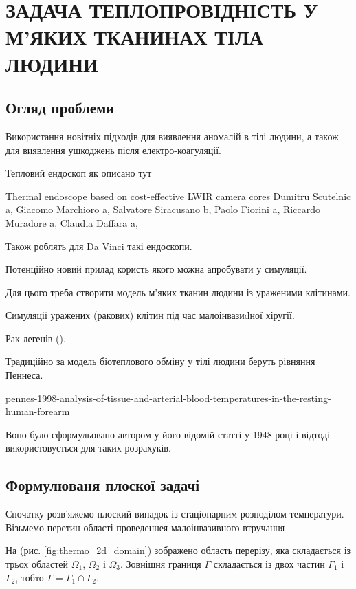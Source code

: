 \chapter{ЗАДАЧА ТЕПЛОПРОВІДНІСТЬ У М'ЯКИХ ТКАНИНАХ ТІЛА ЛЮДИНИ}

\nocite{bahvalov-et-al,tumor-thermal-modell,lung-tumor-thermal-conductivity,database-tissue-properties} 

\section{Огляд проблеми}

Використання новітніх підходів для виявлення аномалій в тілі людини, а також для виявлення ушкоджень після 
електро-коагуляції.

Тепловий ендоскоп як описано тут

Thermal endoscope based on cost-effective LWIR camera cores
Dumitru Scutelnic a, Giacomo Marchioro a, Salvatore Siracusano b, Paolo Fiorini a,
Riccardo Muradore a, Claudia Daffara a,

Також роблять для Da Vinci такі ендоскопи.

Потенційно новий прилад користь якого можна апробувати у симуляції.

Для цього треба створити модель м'яких тканин людини із ураженими клітинами. 

Симуляції уражених (ракових) клітин під час малоінвазиdної хіругії.

Рак легенів (\cite{lung-cancer}).

Традиційно за модель біотеплового обміну у тілі людини беруть рівняння Пеннеса.

pennes-1998-analysis-of-tissue-and-arterial-blood-temperatures-in-the-resting-human-forearm

Воно було сформульовано автором у його відомій статті у 1948 році і відтоді використовується для таких розрахуків.


\section{Формулюваня плоскої задачі}

Спочатку розв'яжемо плоский випадок із стаціонарним розподілом температури.
Візьмемо перетин області проведеннея малоінвазивного втручання

На (рис. \ref{fig:thermo_2d_domain}) зображено область перерізу, яка складається із трьох областей $\Omega_1$, 
$\Omega_2$ і $\Omega_3$. Зовнішня границя $\Gamma$ складається із двох частин $\Gamma_1$ і $\Gamma_2$, тобто 
$\Gamma=\Gamma_1\cap\Gamma_2$. 

